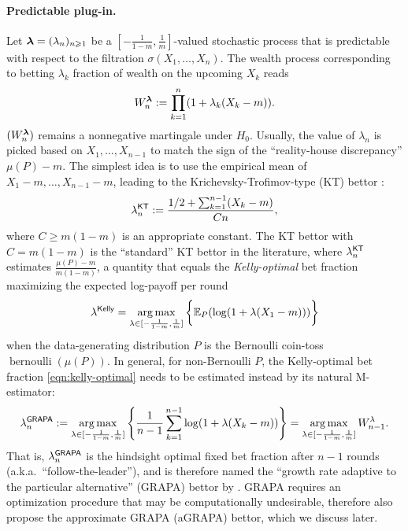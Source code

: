 
\paragraph{Predictable plug-in.} Let $\boldsymbol{\lambda} = (\lambda_n)_{n \geqslant 1}$ be a $[-\frac{1}{1-m}, \frac{1}{m}]$-valued stochastic process that is predictable with respect to the filtration $\sigma(X_1,\dots, X_n)$. The wealth process corresponding to betting $\lambda_k$ fraction of wealth on the upcoming $X_k$ reads
\begin{equation}\label{eqn:predictable}
    W_n^{\boldsymbol{\lambda}} := \prod_{k=1}^n (1 + \lambda_k(X_k - m) ).
\end{equation}
$(W_n^{\boldsymbol{\lambda}})$ remains a nonnegative martingale under $H_0$. Usually, the value of $\lambda_n$ is picked based on $X_1,\dots, X_{n-1}$ to match the sign of the ``reality-house discrepancy'' $\mu(P) - m$. The simplest idea is to use the empirical mean of $X_1-m, \dots, X_{n-1}-m$, leading to the Krichevsky-Trofimov-type (KT) bettor \citep{krichevsky1981performance,orabona2016coin}:
\begin{equation}\label{eqn:kt-lambda}
    \lambda^{\mathsf{KT}}_n := \frac{1/2 + \sum_{k=1}^{n-1}(X_k - m)}{Cn},
\end{equation}
where $C \ge {m(1-m)}$ is an appropriate constant. The KT bettor with $C={m(1-m)}$ is the ``standard'' KT bettor in the literature, where $\lambda^{\mathsf{KT}}_n$ estimates $\frac{\mu(P) - m}{m(1-m)}$, a quantity that equals the \emph{Kelly-optimal} bet fraction maximizing the expected log-payoff per round
\begin{equation}\label{eqn:kelly-optimal}
   \lambda^{\mathsf{Kelly}} = \operatorname*{arg\,max}_{\lambda\in [-\frac{1}{1-m}, \frac{1}{m}]} \bigg\{\mathbb E_P(\log(1+\lambda(X_1 - m)))\bigg\}
\end{equation}
when the data-generating distribution $P$ is the Bernoulli coin-toss $\operatorname{bernoulli}(\mu(P))$.
In general, for non-Bernoulli $P$, the Kelly-optimal bet fraction \eqref{eqn:kelly-optimal} needs to be estimated instead by its natural M-estimator:
\begin{equation}\label{eqn:grapa-lambda}
    \lambda^{\mathsf{GRAPA}}_n := \operatorname*{arg\,max}_{ \lambda \in [-\frac{1}{1-m}, \frac{1}{m}]} \left\{ \frac{1}{n-1}\sum_{k=1}^{n-1} \log(1+\lambda(X_k - m)) \right\} = \operatorname*{arg\,max}_{ \lambda \in [-\frac{1}{1-m}, \frac{1}{m}]} W_{n-1}^\lambda. 
\end{equation}
That is, $\lambda^{\mathsf{GRAPA}}_n$ is the hindsight optimal fixed bet fraction after $n-1$ rounds (a.k.a.\ ``follow-the-leader''), and is therefore named the ``growth rate adaptive to the particular alternative'' (GRAPA) bettor by \cite{waudby2024estimating}. GRAPA requires an optimization procedure that may be computationally undesirable, therefore \cite{waudby2024estimating} also propose the approximate GRAPA (aGRAPA) bettor, which we discuss later.

